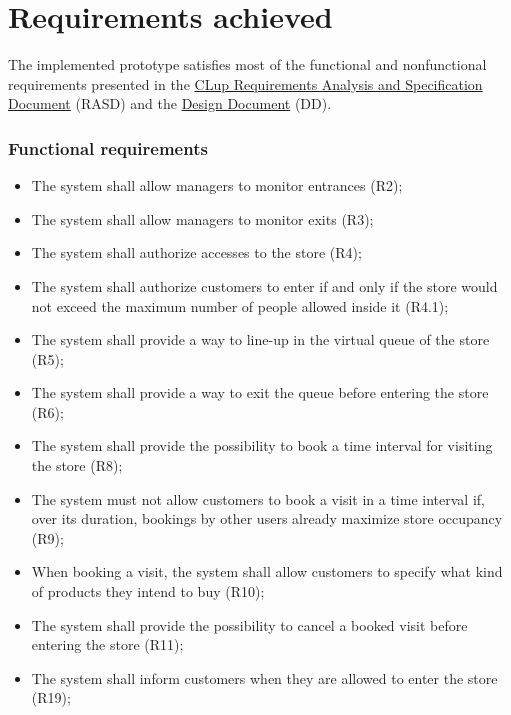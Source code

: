 \documentclass[a4paper,oneside,11pt]{book}
\begin{document}
    \section{Requirements achieved}
    The implemented prototype satisfies most of the functional and nonfunctional requirements presented in the \href{run:../DeliveryFolder/RASD2.pdf}{CLup Requirements Analysis and Specification Document} (RASD) and the \href{run:../DeliveryFolder/DD2.pdf}{Design Document} (DD).
    
    \subsubsection{Functional requirements}
    \begin{itemize}
        \item The system shall allow managers to monitor entrances (R2);
        \item The system shall allow managers to monitor exits (R3);
        \item The system shall authorize accesses to the store (R4);
        \item The system shall authorize customers to enter if and only if the store would not exceed the maximum number of people allowed inside it (R4.1);
        \item The system shall provide a way to line-up in the virtual queue of the store (R5);
        \item The system shall provide a way to exit the queue before entering the store (R6);
        \item The system shall provide the possibility to book a time interval for visiting the store (R8);
        \item The system must not allow customers to book a visit in a time interval if, over its duration, bookings by other users already maximize store occupancy (R9);
        \item When booking a visit, the system shall allow customers to specify what kind of products they intend to buy (R10);
        \item The system shall provide the possibility to cancel a booked visit before entering the store (R11);
        \item The system shall inform customers when they are allowed to enter the store (R19);
    \end{itemize}
    
\end{document}

